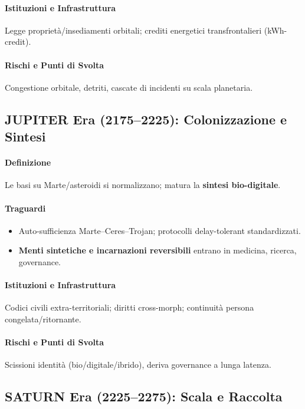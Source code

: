 \documentclass[11pt]{article}
\begin{document}
\begin{itemize}[noitemsep]
\paragraph{Istituzioni e Infrastruttura} Legge proprietà/insediamenti orbitali; crediti energetici transfrontalieri (kWh-credit).

\paragraph{Rischi e Punti di Svolta} Congestione orbitale, detriti, cascate di incidenti su scala planetaria.

\subsection{JUPITER Era (2175–2225): Colonizzazione e Sintesi}
\paragraph{Definizione} Le basi su Marte/asteroidi si normalizzano; matura la \textbf{sintesi bio-digitale}.

\paragraph{Traguardi}
\begin{itemize}[noitemsep]
  \item Auto-sufficienza Marte–Ceres–Trojan; protocolli delay-tolerant standardizzati.
  \item \textbf{Menti sintetiche e incarnazioni reversibili} entrano in medicina, ricerca, governance.
\end{itemize}

\paragraph{Istituzioni e Infrastruttura} Codici civili extra-territoriali; diritti cross-morph; continuità persona congelata/ritornante.

\paragraph{Rischi e Punti di Svolta} Scissioni identità (bio/digitale/ibrido), deriva governance a lunga latenza.

\subsection{SATURN Era (2225–2275): Scala e Raccolta}

\end{itemize}
\end{document}
